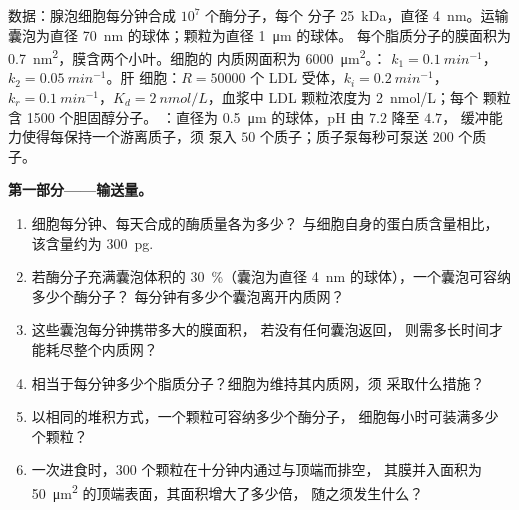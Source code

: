 \begin{problem}
\label{pb:b3:membrane-traffic:1}
数据：腺泡细胞每分钟合成 $10^{7}$ 个酶分子，每个
分子 \qty{25}{kDa}，直径 \qty{4}{nm}。运输囊泡为直径
\qty{70}{nm} 的球体；颗粒为直径 \qty{1}{\micro m} 的球体。
每个脂质分子的膜面积为 \qty{0.7}{nm^2}，膜含两个小叶。细胞的
内质网面积为 \qty{6000}{\micro m^2}。：
$k_{1} = \qty{0.1}{min^{-1}}$，$k_{2} = \qty{0.05}{min^{-1}}$。肝
细胞：$R = \num{50000}$ 个 LDL 受体，$k_{i} = \qty{0.2}{min^{-1}}$，
$k_{r} = \qty{0.1}{min^{-1}}$，$K_{d} = \qty{2}{nmol/L}$，血浆中
LDL 颗粒浓度为 \qty{2}{nmol/L}；每个
颗粒含 \num{1500} 个胆固醇分子。
：直径为 \qty{0.5}{\micro m} 的球体，pH 由 $7.2$ 降至 $4.7$，
缓冲能力使得每保持一个游离质子，须
泵入 $50$ 个质子；质子泵每秒可泵送 $200$ 个质子。

\medskip
\noindent\textbf{第一部分——输送量。}
\begin{enumerate}
  \item 细胞每分钟、每天合成的酶质量各为多少？
        与细胞自身的蛋白质含量相比，该含量约为
        \qty{300}{pg}.
  \item 若酶分子充满囊泡体积的
        \qty{30}{\%}（囊泡为直径 \qty{4}{nm} 的球体），一个囊泡可容纳多少个酶分子？
        每分钟有多少个囊泡离开内质网？
  \item 这些囊泡每分钟携带多大的膜面积，
        若没有任何囊泡返回，
        则需多长时间才能耗尽整个内质网？
  \item 相当于每分钟多少个脂质分子？细胞为维持其内质网，须
        采取什么措施？
  \item 以相同的堆积方式，一个颗粒可容纳多少个酶分子，
        细胞每小时可装满多少个颗粒？
  \item 一次进食时，$300$ 个颗粒在十分钟内通过与顶端而排空，
        其膜并入面积为
        \qty{50}{\micro m^2} 的顶端表面，其面积增大了多少倍，
        随之须发生什么？
\end{enumerate}


\end{problem}
